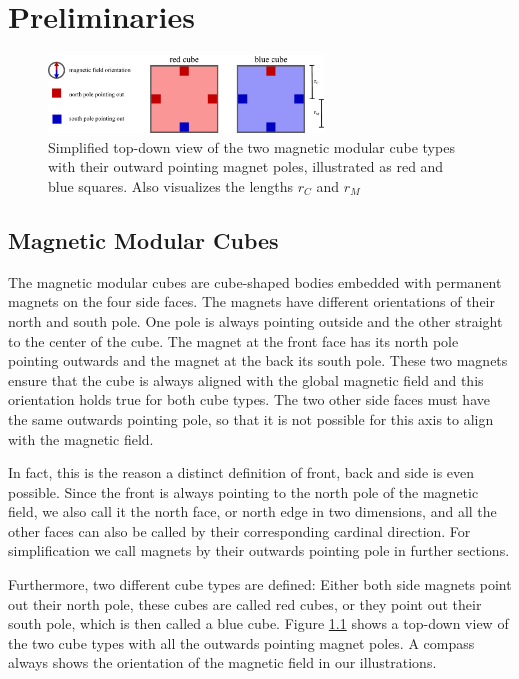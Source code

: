 \chapter{Preliminaries}

\begin{figure}
	\centering
	\includegraphics[width=0.65\textwidth]{figures/magnetic_cubes.pdf}
	\caption{Simplified top-down view of the two magnetic modular cube types with their outward pointing magnet poles, illustrated as red and blue squares. Also visualizes the lengths $r_C$ and $r_M$}
	\label{fig:magnetic_cubes}
\end{figure}

\section{Magnetic Modular Cubes}
The magnetic modular cubes are cube-shaped bodies embedded with permanent magnets on the four side faces.
The magnets have different orientations of their north and south pole. 
One pole is always pointing outside and the other straight to the center of the cube.
The magnet at the front face has its north pole pointing outwards and the magnet at the back its south pole.
These two magnets ensure that the cube is always aligned with the global magnetic field and this orientation holds true for both cube types.
The two other side faces must have the same outwards pointing pole, so that it is not possible for this axis to align with the magnetic field.

In fact, this is the reason a distinct definition of front, back and side is even possible.
Since the front is always pointing to the north pole of the magnetic field, we also call it the north face, or north edge in two dimensions, and all the other faces can also be called by their corresponding cardinal direction.
For simplification we call magnets by their outwards pointing pole in further sections.

Furthermore, two different cube types are defined:
Either both side magnets point out their north pole, these cubes are called red cubes, or they point out their south pole, which is then called a blue cube.
Figure \ref{fig:magnetic_cubes} shows a top-down view of the two cube types with all the outwards pointing magnet poles.
A compass always shows the orientation of the magnetic field in our illustrations.

